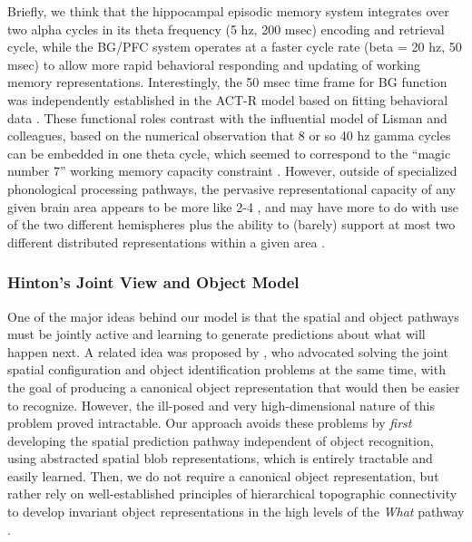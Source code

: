 \documentclass[11pt,twoside]{article}
\newif\myifpdf
\begin{document}
Briefly, we think that the hippocampal episodic memory system integrates over two alpha cycles in its theta frequency (5 hz, 200 msec) encoding and retrieval cycle, while the BG/PFC system operates at a faster cycle rate (beta = 20 hz, 50 msec) to allow more rapid behavioral responding and updating of working memory representations.  Interestingly, the 50 msec time frame for BG function was independently established in the ACT-R model based on fitting behavioral data \cite{StoccoLebiereAnderson10,AndersonLebiere98,JilkLebiereOReillyEtAl08}.  These functional roles contrast with the influential model of Lisman and colleagues, based on the numerical observation that 8 or so 40 hz gamma cycles can be embedded in one theta cycle, which seemed to correspond to the ``magic number 7'' working memory capacity constraint \cite{IdiartLisman95,LismanJensen13}.  However, outside of specialized phonological processing pathways, the pervasive representational capacity of any given brain area appears to be more like 2-4 \cite{Cowan01}, and may have more to do with use of the two different hemispheres plus the ability to (barely) support at most two different distributed representations within a given area \cite{BuschmanSiegelRoyEtAl11}.

\subsubsection{Hinton's Joint View and Object Model}

One of the major ideas behind our model is that the spatial and object pathways must be jointly active and learning to generate predictions about what will happen next.  A related idea was proposed by , who advocated solving the joint spatial configuration and object identification problems at the same time, with the goal of producing a canonical object representation that would then be easier to recognize.  However, the ill-posed and very high-dimensional nature of this problem proved intractable.  Our approach avoids these problems by {\em first} developing the spatial prediction pathway independent of object recognition, using abstracted spatial blob representations, which is entirely tractable and easily learned.  Then, we do not require a canonical object representation, but rather rely on well-established principles of hierarchical topographic connectivity to develop invariant object representations in the high levels of the {\em What} pathway \cite{Fukushima80,RiesenhuberPoggio99,OReillyWyatteHerdEtAl13}.
\end{document}
